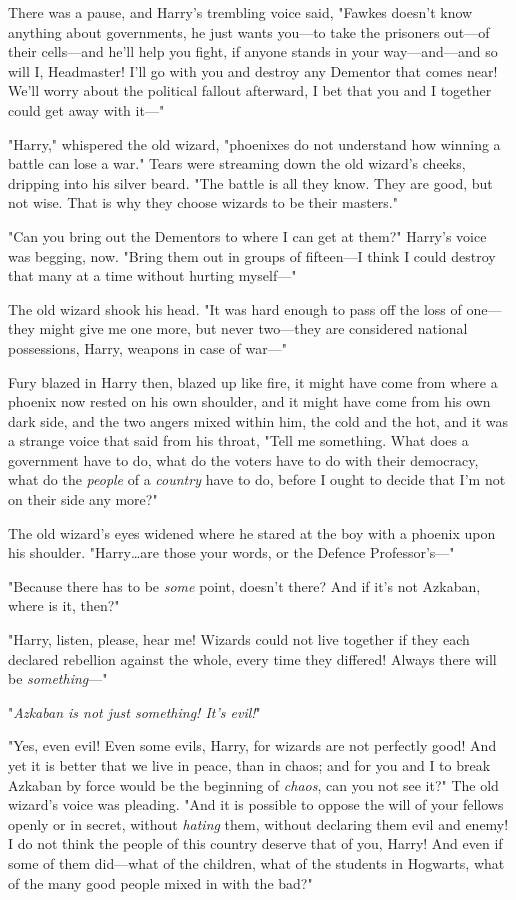 There was a pause, and Harry's trembling voice said, "Fawkes doesn't know
anything about governments, he just wants you---to take the prisoners out---of
their cells---and he'll help you fight, if anyone stands in your
way---and---and so will I, Headmaster! I'll go with you and destroy any
Dementor that comes near! We'll worry about the political fallout afterward, I
bet that you and I together could get away with it---"

"Harry," whispered the old wizard, "phoenixes do not understand how winning a
battle can lose a war." Tears were streaming down the old wizard's cheeks,
dripping into his silver beard. "The battle is all they know. They are good,
but not wise. That is why they choose wizards to be their masters."

"Can you bring out the Dementors to where I can get at them?" Harry's voice was
begging, now. "Bring them out in groups of fifteen---I think I could destroy
that many at a time without hurting myself---"

The old wizard shook his head. "It was hard enough to pass off the loss of
one---they might give me one more, but never two---they are considered national
possessions, Harry, weapons in case of war---"

Fury blazed in Harry then, blazed up like fire, it might have come from where a
phoenix now rested on his own shoulder, and it might have come from his own
dark side, and the two angers mixed within him, the cold and the hot, and it
was a strange voice that said from his throat, "Tell me something. What does a
government have to do, what do the voters have to do with their democracy, what
do the \emph{people} of a \emph{country} have to do, before I ought to decide
that I'm not on their side any more?"

The old wizard's eyes widened where he stared at the boy with a phoenix upon
his shoulder. "Harry…are those your words, or the Defence
Professor's---"

"Because there has to be \emph{some} point, doesn't there? And if it's not
Azkaban, where is it, then?"

"Harry, listen, please, hear me! Wizards could not live together if they each
declared rebellion against the whole, every time they differed! Always there
will be \emph{something}---"

"\emph{Azkaban is not just something! It's evil!}"

"Yes, even evil! Even some evils, Harry, for wizards are not perfectly good!
And yet it is better that we live in peace, than in chaos; and for you and I to
break Azkaban by force would be the beginning of \emph{chaos}, can you not see
it?" The old wizard's voice was pleading. "And it is possible to oppose the
will of your fellows openly or in secret, without \emph{hating} them, without
declaring them evil and enemy! I do not think the people of this country
deserve that of you, Harry! And even if some of them did---what of the
children, what of the students in Hogwarts, what of the many good people mixed
in with the bad?"

